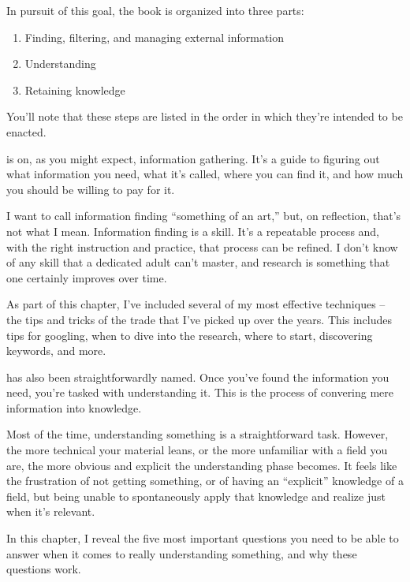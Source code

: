 In pursuit of this goal, the book is organized into three parts:

\begin{enumerate}
  \item Finding, filtering, and managing external information
  \item Understanding
  \item Retaining knowledge
\end{enumerate}

You'll note that these steps are listed in the order in which they're intended to be enacted.

 is on, as you might expect, information gathering. It's a guide
to figuring out what information you need, what it's called, where you can find
it, and how much you should be willing to pay for it.

I want to call information finding ``something of an art,'' but, on reflection,
that's not what I mean. Information finding is a skill. It's a repeatable
process and, with the right instruction and practice, that process can be
refined. I don't know of any skill that a dedicated adult can't
master, and research is something
that one certainly improves over time.

As part of this chapter, I've included several of my most effective techniques
-- the tips and tricks of the trade that I've picked up over the years. This
includes tips for googling, when to dive into the research, where to start,
discovering keywords, and more.

 has also been straightforwardly
named. Once you've found the information you need, you're tasked with
understanding it. This is the process of convering mere information into
knowledge.

Most of the time, understanding something is a straightforward task. However,
the more technical your material leans, or the more unfamiliar with a field you
are, the more obvious and explicit the understanding phase becomes. It feels
like the frustration of not getting something, or of having an ``explicit''
knowledge of a field, but being unable to spontaneously apply that knowledge and
realize just when it's relevant.

In this chapter, I reveal the five most important questions you need to be able to
answer when it comes to really understanding something, and why these questions
work.

